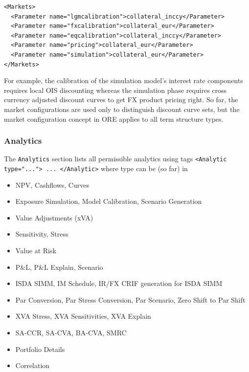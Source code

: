 \begin{listing}[H]
\begin{verbatim}
<Markets>
  <Parameter name="lgmcalibration">collateral_inccy</Parameter>
  <Parameter name="fxcalibration">collateral_eur</Parameter>
  <Parameter name="eqcalibration">collateral_inccy</Parameter>
  <Parameter name="pricing">collateral_eur</Parameter>
  <Parameter name="simulation">collateral_eur</Parameter>
</Markets>
\end{verbatim}
\caption{ORE markets}
\label{lst:ore_markets}
\end{listing}

For example, the calibration of the simulation model's interest rate components requires local OIS discounting whereas
the simulation phase requires cross currency adjusted discount curves to get FX product pricing right. So far, the
market configurations are used only to distinguish discount curve sets, but the market configuration concept in ORE
applies to all term structure types.

\subsubsection*{Analytics}\label{sec:analytics}

The {\tt Analytics} section lists all permissible analytics using tags {\tt <Analytic type="..."> ... </Analytic>} where
type can be (so far) in
\begin{itemize}
\item NPV, Cashflows, Curves
\item Exposure Simulation, Model Calibration, Scenario Generation
\item Value Adjustments (xVA)
\item Sensitivity, Stress
\item Value at Risk
\item P\&L, P\&L Explain, Scenario
\item ISDA SIMM, IM Schedule, IR/FX CRIF generation for ISDA SIMM
\item Par Conversion, Par Stress Conversion, Par Scenario, Zero Shift to Par Shift
\item XVA Stress, XVA Sensitivities, XVA Explain
\item SA-CCR, SA-CVA, BA-CVA, SMRC
\item Portfolio Details
\item Correlation
\end{itemize}

